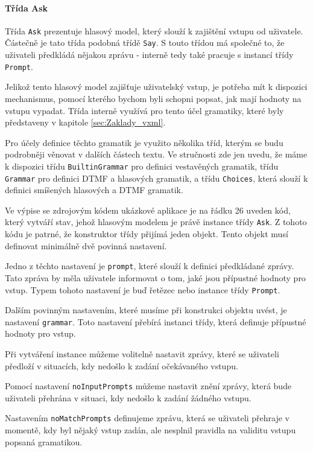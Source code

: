 \documentclass[ing,male,java,dept460]{diploma}						%
\begin{document}
\paragraph{Třída Ask}
\label{sec:Ask}
Třída \texttt{Ask} prezentuje hlasový model, který slouží k zajištění vstupu od uživatele. Částečně je tato třída podobná třídě \texttt{Say}. S touto třídou má společné to, že uživateli předkládá nějakou zprávu - interně tedy také pracuje s instancí třídy \texttt{Prompt}.

Jelikož tento hlasový model zajišťuje uživatelský vstup, je potřeba mít k dispozici mechanismus, pomocí kterého bychom byli schopni popsat, jak mají hodnoty na vstupu vypadat. Třída interně využívá pro tento účel gramatiky, které byly představeny v kapitole \ref{sec:Zaklady_vxml}.

Pro účely definice těchto gramatik je využito několika tříd, kterým se budu podrobněji věnovat v dalších částech textu. Ve stručnosti zde jen uvedu, že máme k dispozici třídu \texttt{BuiltinGrammar} pro definici vestavěných gramatik, třídu \texttt{Grammar} pro definici DTMF a hlasových gramatik, a třídu \texttt{Choices}, která slouží k definici smíšených hlasových a DTMF gramatik.

Ve výpise se zdrojovým kódem ukázkové aplikace je na řádku 26 uveden kód, který vytváří stav, jehož hlasovým modelem je právě instance třídy \texttt{Ask}. Z tohoto kódu je patrné, že konstruktor třídy přijímá jeden objekt. Tento objekt musí definovat minimálně dvě povinná nastavení.

Jedno z těchto nastavení je \texttt{prompt}, které slouží k definici předkládané zprávy. Tato zpráva by měla uživatele informovat o tom, jaké jsou přípustné hodnoty pro vstup. Typem tohoto nastavení je buď řetězec nebo instance třídy \texttt{Prompt}.

Dalším povinným nastavením, které musíme při konstrukci objektu uvést, je nastavení \texttt{grammar}. Toto nastavení přebírá instanci třídy, která definuje přípustné hodnoty pro vstup.

Při vytváření instance můžeme volitelně nastavit zprávy, které se uživateli předloží v situacích, kdy nedošlo k zadání očekávaného vstupu.

Pomocí nastavení \texttt{noInputPrompts} můžeme nastavit znění zprávy, která bude uživateli přehrána v situaci, kdy nedošlo k zadání žádného vstupu.

Nastavením \texttt{noMatchPrompts} definujeme zprávu, která se uživateli přehraje v momentě, kdy byl nějaký vstup zadán, ale nesplnil pravidla na validitu vstupu popsaná gramatikou.
\end{document}
